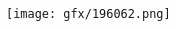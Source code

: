 \begin{titlepage}
    \begin{addmargin}[-1cm]{-3cm}
    \begin{center}
        \large  

        \hfill

        \vfill

        \begingroup
            \color{Maroon}\spacedallcaps{\myTitle} \\ \bigskip
        \endgroup
        
        \mySubtitle
        
        \vspace{1cm}

        \spacedlowsmallcaps{\myName} 

                

        \vfill

        \texttt{[image: gfx/196062.png]} \\ \medskip

           

        \myTime

        \vfill                      

    \end{center}  
  \end{addmargin}       
\end{titlepage}   